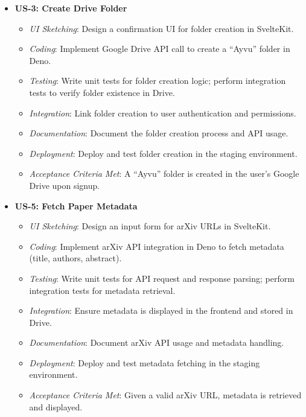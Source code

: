 \documentclass[12pt]{article}
\begin{document}
\begin{itemize}
  \item \textbf{US-3: Create Drive Folder}
    \begin{itemize}
      \item \textit{UI Sketching}: Design a confirmation UI for folder creation in SvelteKit.
      \item \textit{Coding}: Implement Google Drive API call to create a ``Ayvu'' folder in Deno.
      \item \textit{Testing}: Write unit tests for folder creation logic; perform integration tests to verify folder existence in Drive.
      \item \textit{Integration}: Link folder creation to user authentication and permissions.
      \item \textit{Documentation}: Document the folder creation process and API usage.
      \item \textit{Deployment}: Deploy and test folder creation in the staging environment.
      \item \textit{Acceptance Criteria Met}: A ``Ayvu'' folder is created in the user's Google Drive upon signup.
    \end{itemize}

  \item \textbf{US-5: Fetch Paper Metadata}
    \begin{itemize}
      \item \textit{UI Sketching}: Design an input form for arXiv URLs in SvelteKit.
      \item \textit{Coding}: Implement arXiv API integration in Deno to fetch metadata (title, authors, abstract).
      \item \textit{Testing}: Write unit tests for API request and response parsing; perform integration tests for metadata retrieval.
      \item \textit{Integration}: Ensure metadata is displayed in the frontend and stored in Drive.
      \item \textit{Documentation}: Document arXiv API usage and metadata handling.
      \item \textit{Deployment}: Deploy and test metadata fetching in the staging environment.
      \item \textit{Acceptance Criteria Met}: Given a valid arXiv URL, metadata is retrieved and displayed.
    \end{itemize}


\end{itemize}
\end{document}
